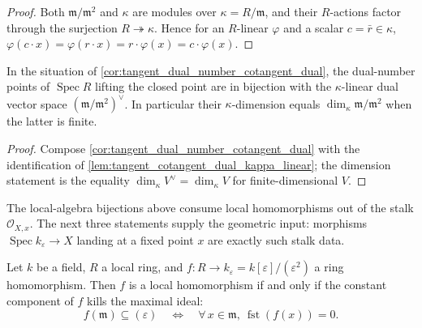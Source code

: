 \begin{proof}\leanok
  Both \(\mathfrak m/\mathfrak m^2\) and \(\kappa\) are modules over
  \(\kappa = R/\mathfrak m\), and their \(R\)-actions factor through
  the surjection \(R \twoheadrightarrow \kappa\). Hence for an
  \(R\)-linear \(\varphi\) and a scalar \(c = \bar r \in \kappa\),
  \(\varphi(c \cdot x) = \varphi(r \cdot x) = r \cdot \varphi(x)
    = c \cdot \varphi(x)\).
\end{proof}

\begin{corollary}\leanok
  \label{cor:tangent_dual_number_cotangent_space_dual}
  In the situation of \cref{cor:tangent_dual_number_cotangent_dual},
  the dual-number points of \(\operatorname{Spec} R\) lifting the
  closed point are in bijection with the \(\kappa\)-linear dual
  vector space \((\mathfrak m/\mathfrak m^2)^{\vee}\). In particular
  their \(\kappa\)-dimension equals
  \(\dim_\kappa \mathfrak m/\mathfrak m^2\) when the latter is
  finite.
\end{corollary}

\begin{proof}\leanok
  Compose \cref{cor:tangent_dual_number_cotangent_dual} with the
  identification of \cref{lem:tangent_cotangent_dual_kappa_linear};
  the dimension statement is the equality
  \(\dim_\kappa V^{\vee} = \dim_\kappa V\) for finite-dimensional
  \(V\).
\end{proof}

The local-algebra bijections above consume local homomorphisms out of
the stalk \(\mathcal O_{X,x}\). The next three statements supply the
geometric input: morphisms \(\operatorname{Spec} k_\varepsilon \to X\)
landing at a fixed point \(x\) are exactly such stalk data.

\begin{lemma}\leanok
  \label{lem:tangent_dual_number_local_iff}
  Let \(k\) be a field, \(R\) a local ring, and
  \(f : R \to k_\varepsilon = k[\varepsilon]/(\varepsilon^2)\) a ring
  homomorphism. Then \(f\) is a local homomorphism if and only if the
  constant component of \(f\) kills the maximal ideal:
  \[
    f(\mathfrak m) \subseteq (\varepsilon)
    \quad\Longleftrightarrow\quad
    \forall\, x \in \mathfrak m,\ \operatorname{fst}(f(x)) = 0 .
  \]
\end{lemma}

